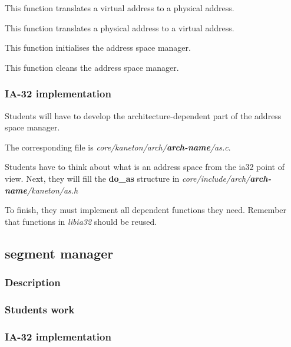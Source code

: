 
This function translates a virtual address to a physical address.


This function translates a physical address to a virtual address.


This function initialises the address space manager.


This function cleans the address space manager.

%
%

\subsubsection{IA-32 implementation}

Students will  have to develop the architecture-dependent  part of the
address space manager.

The corresponding file is \textit{core/kaneton/arch/\textbf{arch-name}/as.c}.

Students have  to think about what  is an address space  from the ia32
point of view.  Next, they will fill the \textbf{do\_as} structure in
\textit{core/include/arch/\textbf{arch-name}/kaneton/as.h}

To  finish,   they  must   implement  all  dependent   functions  they
need. Remember that functions in \textit{libia32} should be reused.

%
%

\subsection{segment manager}

\subsubsection{Description}

\subsubsection{Students work}

\subsubsection{IA-32 implementation}
